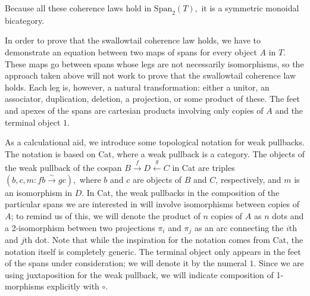 \documentclass[12pt,twoside,openright]{report}
\newcommand{\maps}{\colon}
\newcommand{\x}{\times}
\newcommand{\Span}{\mbox{Span}}
\begin{document}
Because all these coherence laws hold in $\Span_2(T),$ it is a symmetric monoidal bicategory.

\newcommand{\pb}[1]{\begin{tikzpicture}[dot/.style={fill,inner sep=1pt,circle}, scale=.2]
  \foreach \x / \y [remember=\x as \lastx(initially 0), count=\n] in {#1}
    \draw[\ifnum\y>0 black\else white\fi] (\lastx, 0) to[out=90,in=90,looseness=1.7] (\x, 0);
  \foreach \x in {0,...,\n} \draw[black] (\x,0) node[dot]{};
\end{tikzpicture}}

In order to prove that the swallowtail coherence law holds, we have to demonstrate an equation between two maps of spans for every object $A$ in $T$.  These maps go between spans whose legs are not necessarily isomorphisms, so the approach taken above will not work to prove that the swallowtail coherence law holds.  Each leg is, however, a natural transformation: either a unitor, an associator, duplication, deletion, a projection, or some product of these.  The feet and apexes of the spans are cartesian products involving only copies of $A$ and the terminal object $1$.

As a calculational aid, we introduce some topological notation for weak pullbacks.  The notation is based on Cat, where a weak pullback is a category.  The objects of the weak pullback of the cospan $B \stackrel{f}{\to} D \stackrel{g}{\leftarrow} C$ in Cat are triples $(b, c, m\maps fb \stackrel{\sim}{\to} gc),$ where $b$ and $c$ are objects of $B$ and $C$, respectively, and $m$ is an isomorphism in $D$.  In Cat, the weak pullbacks in the composition of the particular spans we are interested in will involve isomorphisms between copies of $A$; to remind us of this, we will denote the product of $n$ copies of $A$ as $n$ dots and a 2-isomorphism between two projections $\pi_i$ and $\pi_j$ as an arc connecting the $i$th and $j$th dot.  Note that while the inspiration for the notation comes from Cat, the notation itself is completely generic.  The terminal object only appears in the feet of the spans under consideration; we will denote it by the numeral $1$.  Since we are using juxtaposition for the weak pullback, we will indicate composition of 1-morphisms explicitly with $\circ$.
\end{document}
